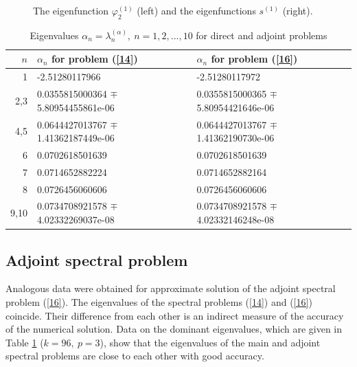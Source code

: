 \documentclass[authoryear]{elsarticle}
\begin{document}
\begin{figure}[!h]
\begin{center}
\begin{minipage}{0.49\linewidth}
\end{minipage}
\caption{The eigenfunction $\varphi^{(1)}_2$ (left) and the eigenfunctions $s^{(1)}$  (right).}
\label{fig:9}
  \end{center}
\end{figure}

\begin{table}[h]
\caption{Eigenvalues $\alpha_n = \lambda_n^{(\alpha )}, \ n = 1,2, ..., 10$
for direct and adjoint problems}
\label{t-4}
\begin{center}
\begin{tabular}{rll}
\hline
$n$ & $\alpha_n$ for problem (\ref{14}) & $\alpha_n$ for problem (\ref{16}) \\
\hline
1 & -2.51280117966 & -2.51280117972 \\
2,3 & 0.0355815000364 $\mp$ 5.80954455861e-06 & 0.0355815000365 $\mp$ 5.80954421646e-06 \\
4,5 & 0.0644427013767 $\mp$ 1.41362187449e-06 & 0.0644427013767 $\mp$ 1.41362190730e-06 \\
6 & 0.0702618501639 & 0.0702618501639 \\
7 & 0.0714652882224 & 0.0714652882164 \\
8 & 0.0726456060606 & 0.0726456060606 \\
9,10 & 0.0734708921578 $\mp$ 4.02332269037e-08 & 0.0734708921578 $\mp$ 4.02332146248e-08 \\
\hline
\end{tabular}
\end{center}
\end{table}

\subsection{Adjoint spectral problem} 

Analogous data were obtained for approximate solution of the adjoint spectral problem (\ref{16}).
The eigenvalues of the spectral problems (\ref{14}) and (\ref{16}) coincide. Their difference from each other is an indirect measure of the accuracy of the numerical solution. Data on the dominant eigenvalues, which are given in Table \ref{t-4} ($k=96, \ p = 3$), show that the eigenvalues of the main and adjoint spectral problems are close to each other with good accuracy.
\end{document}
